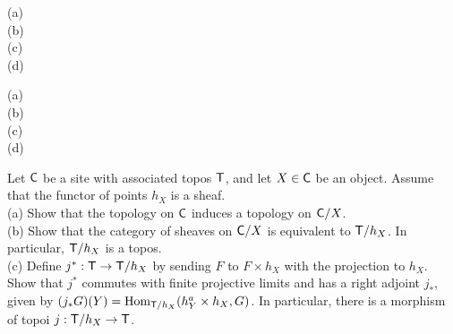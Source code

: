 \begin{exercise}[2.2]
  (a)\\
  (b)\\
  (c)\\
  (d)
\end{exercise}

\begin{exercise}[2.3]
  (a)\\
  (b)\\
  (c)\\
  (d)
\end{exercise}

\begin{exercise}[2.4]
  Let $\text{\sf C}$ be a site with associated topos $\text{\sf T}$, and let $X\in \text{\sf C}$ be an object. Assume
  that the functor of points $h_X$ is a sheaf.\\
  (a) Show that the topology on $\text{\sf C}$ induces a topology on $\text{\sf C}/X$.\\
  (b) Show that the category of sheaves on $\text{\sf C}/X$ is equivalent to $\text{\sf T}/h_X$. In
  particular, $\text{\sf T}/h_X$ is a topos.\\
  (c) Define $j^*:\text{\sf T}\to \text{\sf T}/h_X$ by sending $F$ to $F\times h_X$ with the projection to
  $h_X$. Show that $j^*$ commutes with finite projective limits and has a right adjoint
  $j_*$, given by $(j_*G)(Y)=\operatorname{Hom}_{\text{\sf T}/h_X}(h_Y^a\times h_X,G)$. In particular, there is
  a morphism of topoi $j:\text{\sf T}/h_X\to \text{\sf T}$.
\end{exercise}
